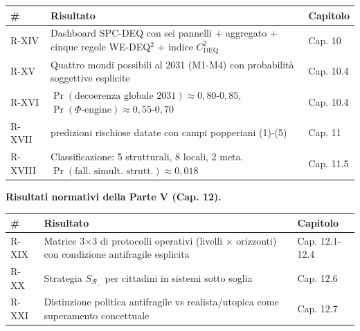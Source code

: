 {\def\LTcaptype{none} %
{\small\begin{longtable}[]{@{}
  >{\raggedright\arraybackslash}p{}
  >{\raggedright\arraybackslash}p{}
  >{\raggedright\arraybackslash}p{}@{}}
\toprule\noalign{}
\begin{minipage}[b]{\linewidth}\raggedright
\#
\end{minipage} & \begin{minipage}[b]{\linewidth}\raggedright
Risultato
\end{minipage} & \begin{minipage}[b]{\linewidth}\raggedright
Capitolo
\end{minipage} \\
\midrule\noalign{}
\endhead
\bottomrule\noalign{}
\endlastfoot
R-XIV & Dashboard SPC-DEQ con sei pannelli + aggregato + cinque regole
WE-DEQ$^2$ + indice \(C_{\text{DEQ}}^2\) & Cap. 10 \\
R-XV & Quattro mondi possibili al 2031 (M1-M4) con probabilità
soggettive esplicite & Cap. 10.4 \\
R-XVI &
\(\Pr(\text{decoerenza globale 2031}) \approx 0{,}80\)-\(0{,}85\),
\(\Pr(\Phi\text{-engine}) \approx 0{,}55\)-\(0{,}70\) & Cap. 10.4 \\
R-XVII & 16 predizioni rischiose datate con campi popperiani (1)-(5) &
Cap. 11 \\
R-XVIII & Classificazione: 5 strutturali, 8 locali, 2 meta.
\(\Pr(\text{fall. simult. strutt.}) \approx 0{,}018\) & Cap. 11.5 \\
\end{longtable}}
}

\Proved{} \textbf{Risultati normativi della Parte V (Cap. 12).}

{\def\LTcaptype{none} %
{\small\begin{longtable}[]{@{}
  >{\raggedright\arraybackslash}p{}
  >{\raggedright\arraybackslash}p{}
  >{\raggedright\arraybackslash}p{}@{}}
\toprule\noalign{}
\begin{minipage}[b]{\linewidth}\raggedright
\#
\end{minipage} & \begin{minipage}[b]{\linewidth}\raggedright
Risultato
\end{minipage} & \begin{minipage}[b]{\linewidth}\raggedright
Capitolo
\end{minipage} \\
\midrule\noalign{}
\endhead
\bottomrule\noalign{}
\endlastfoot
R-XIX & Matrice 3$\times$3 di protocolli operativi (livelli $\times$ orizzonti) con
condizione antifragile esplicita & Cap. 12.1-12.4 \\
R-XX & Strategia \(S_{\mathcal{R}_-}\) per cittadini in sistemi sotto
soglia & Cap. 12.6 \\
R-XXI & Distinzione politica antifragile vs realista/utopica come
superamento concettuale & Cap. 12.7 \\
\end{longtable}}
}

